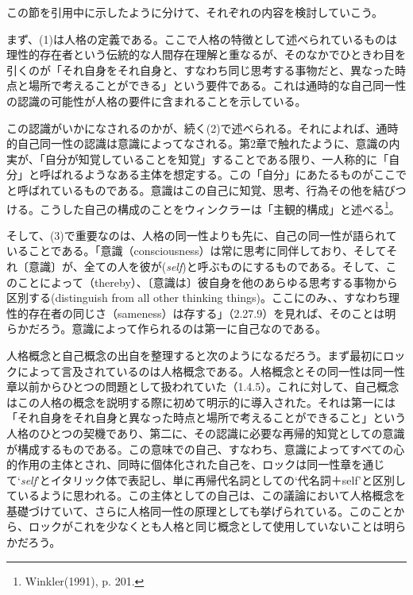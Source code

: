 \documentclass[a4j,oneside]{jsbook}
\begin{document}
この節を引用中に示したように分けて、それぞれの内容を検討していこう。
\par
まず、(1)は人格の定義である。ここで人格の特徴として述べられているものは理性的存在者という伝統的な人間存在理解と重なるが、そのなかでひときわ目を引くのが「それ自身をそれ自身と、すなわち同じ思考する事物だと、異なった時点と場所で考えることができる」という要件である。これは通時的な自己同一性の認識の可能性が人格の要件に含まれることを示している。
\par
この認識がいかになされるのかが、続く(2)で述べられる。それによれば、通時的自己同一性の認識は意識によってなされる。第2章で触れたように、意識の内実が、「自分が知覚していることを知覚」することである限り、一人称的に「自分」と呼ばれるようなある主体を想定する。この「自分」にあたるものがここでと呼ばれているものである。意識はこの自己に知覚、思考、行為その他を結びつける。こうした自己の構成のことをウィンクラーは「主観的構成」と述べる\footnote{Winkler(1991), p. 201.}。
\par
そして、(3)で重要なのは、人格の同一性よりも先に、自己の同一性が語られていることである。「意識（consciousness）は常に思考に同伴しており、そしてそれ〔意識〕が、全ての人を彼が({\itshape self})と呼ぶものにするものである。そして、このことによって（thereby）、〔意識は〕彼自身を他のあらゆる思考する事物から区別する(distinguish from all other thinking things)。ここにのみ、、すなわち理性的存在者の同じさ（sameness）は存する」（2.27.9）を見れば、そのことは明らかだろう。意識によって作られるのは第一に自己なのである。
\par
人格概念と自己概念の出自を整理すると次のようになるだろう。まず最初にロックによって言及されているのは人格概念である。人格概念とその同一性は同一性章以前からひとつの問題として扱われていた（1.4.5）。これに対して、自己概念はこの人格の概念を説明する際に初めて明示的に導入された。それは第一には「それ自身をそれ自身と異なった時点と場所で考えることができること」という人格のひとつの契機であり、第二に、その認識に必要な再帰的知覚としての意識が構成するものである。この意味での自己、すなわち、意識によってすべての心的作用の主体とされ、同時に個体化された自己を、ロックは同一性章を通じて‘{\itshape self}’とイタリック体で表記し、単に再帰代名詞としての‘代名詞＋self’と区別しているように思われる。この主体としての自己は、この議論において人格概念を基礎づけていて、さらに人格同一性の原理としても挙げられている。このことから、ロックがこれを少なくとも人格と同じ概念として使用していないことは明らかだろう。
\end{document}
